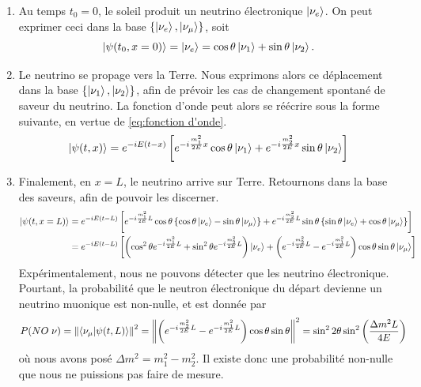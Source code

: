 \documentclass[../notesdecours.tex]{subfiles}
\begin{document}
\begin{enumerate}
    \item Au temps $t_0 = 0$, le soleil produit un neutrino électronique $\ket{\nu_e}$. On peut exprimer ceci dans la base $\left\{\ket{\nu_e},\ket{\nu_\mu}\right\}$, soit
    \begin{equation*}
        \ket{\psi(t_0,x=0)} = \ket{\nu_e} = \cos\theta\ket{\nu_1}+\sin\theta\ket{\nu_2}.
    \end{equation*}
    \item Le neutrino se propage vers la Terre. Nous exprimons alors ce déplacement dans la base $\left\{\ket{\nu_1},\ket{\nu_2}\right\}$, afin de prévoir les cas de changement spontané de saveur du neutrino. La fonction d'onde peut alors se réécrire sous la forme suivante, en vertue de \eqref{eq:fonction d'onde}.
    \begin{equation*}
        \ket{\psi(t,x)} = e^{-iE\left(t-x\right)}\left[e^{-i\frac{m_1^2}{2E}x}\cos\theta\ket{\nu_1}+e^{-i\frac{m_2^2}{2E}x}\sin\theta\ket{\nu_2}\right]
    \end{equation*}
    \item Finalement, en $x=L$, le neutrino arrive sur Terre. Retournons dans la base des saveurs, afin de pouvoir les discerner. 
    \begin{align*}
        \ket{\psi(t,x=L)} &= e^{-iE\left(t-L\right)}\left[e^{-i\frac{m_1^2}{2E}L}\cos\theta\left\{\cos\theta\ket{\nu_e}-\sin\theta\ket{\nu_\mu}\right\}+e^{-i\frac{m_2^2}{2E}L}\sin\theta\left\{\sin\theta\ket{\nu_e}+\cos\theta\ket{\nu_\mu}\right\}\right]\\
        &= e^{-iE\left(t-L\right)}\left[\left(\cos^2\theta e^{-i\frac{m_1^2}{2E}L}+\sin^2\theta e^{-i\frac{m_2^2}{2E}L}\right)\ket{\nu_e}+\left(e^{-i\frac{m_2^2}{2E}L}-e^{-i\frac{m_1^2}{2E}L}\right)\cos\theta\sin\theta\ket{\nu_\mu}\right]
    \end{align*}
Expérimentalement, nous ne pouvons détecter que les neutrino électronique. Pourtant, la probabilité que le neutron électronique du départ devienne un neutrino muonique est non-nulle, et est donnée par
\begin{align}
    P(NO \; \nu) &= \norm{\braket{\nu_\mu|\psi(t,L)}}^2 = \norm{\left(e^{-i\frac{m_2^2}{2E}L}-e^{-i\frac{m_1^2}{2E}L}\right)\cos\theta\sin\theta}^2 = \sin^22\theta\sin^2\left(\frac{\Delta m^2L}{4E}\right)
\end{align}
où nous avons posé $\Delta m^2 = m_1^2-m_2^2$. Il existe donc une probabilité non-nulle que nous ne puissions pas faire de mesure.
\end{enumerate}
\end{document}
